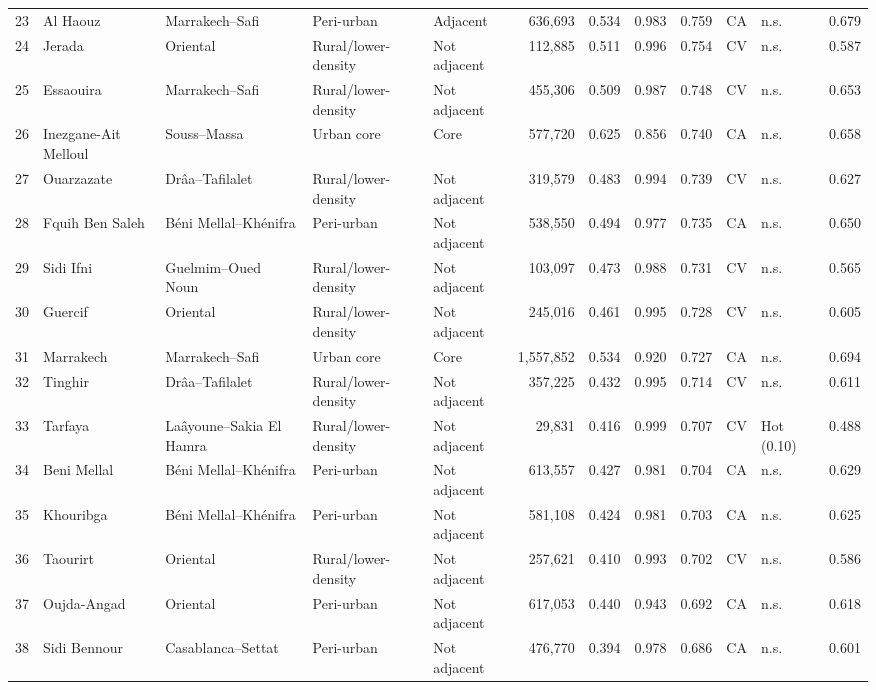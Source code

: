 \documentclass[10pt]{article}
\begin{document}
\begin{longtable}{@{}r>{\raggedright\arraybackslash}p{2.9cm}>{\raggedright\arraybackslash}p{3.3cm}llrrrrllr@{}}
23 & Al Haouz & Marrakech--Safi & Peri-urban & Adjacent & 636,693 & 0.534 & 0.983 & 0.759 & CA & n.s. & 0.679 \\
24 & Jerada & Oriental & Rural/lower-density & Not adjacent & 112,885 & 0.511 & 0.996 & 0.754 & CV & n.s. & 0.587 \\
25 & Essaouira & Marrakech--Safi & Rural/lower-density & Not adjacent & 455,306 & 0.509 & 0.987 & 0.748 & CV & n.s. & 0.653 \\
26 & Inezgane-Ait Melloul & Souss--Massa & Urban core & Core & 577,720 & 0.625 & 0.856 & 0.740 & CA & n.s. & 0.658 \\
27 & Ouarzazate & Drâa--Tafilalet & Rural/lower-density & Not adjacent & 319,579 & 0.483 & 0.994 & 0.739 & CV & n.s. & 0.627 \\
28 & Fquih Ben Saleh & Béni Mellal--Khénifra & Peri-urban & Not adjacent & 538,550 & 0.494 & 0.977 & 0.735 & CA & n.s. & 0.650 \\
29 & Sidi Ifni & Guelmim--Oued Noun & Rural/lower-density & Not adjacent & 103,097 & 0.473 & 0.988 & 0.731 & CV & n.s. & 0.565 \\
30 & Guercif & Oriental & Rural/lower-density & Not adjacent & 245,016 & 0.461 & 0.995 & 0.728 & CV & n.s. & 0.605 \\
31 & Marrakech & Marrakech--Safi & Urban core & Core & 1,557,852 & 0.534 & 0.920 & 0.727 & CA & n.s. & 0.694 \\
32 & Tinghir & Drâa--Tafilalet & Rural/lower-density & Not adjacent & 357,225 & 0.432 & 0.995 & 0.714 & CV & n.s. & 0.611 \\
33 & Tarfaya & Laâyoune--Sakia El Hamra & Rural/lower-density & Not adjacent & 29,831 & 0.416 & 0.999 & 0.707 & CV & Hot (0.10) & 0.488 \\
34 & Beni Mellal & Béni Mellal--Khénifra & Peri-urban & Not adjacent & 613,557 & 0.427 & 0.981 & 0.704 & CA & n.s. & 0.629 \\
35 & Khouribga & Béni Mellal--Khénifra & Peri-urban & Not adjacent & 581,108 & 0.424 & 0.981 & 0.703 & CA & n.s. & 0.625 \\
36 & Taourirt & Oriental & Rural/lower-density & Not adjacent & 257,621 & 0.410 & 0.993 & 0.702 & CV & n.s. & 0.586 \\
37 & Oujda-Angad & Oriental & Peri-urban & Not adjacent & 617,053 & 0.440 & 0.943 & 0.692 & CA & n.s. & 0.618 \\
38 & Sidi Bennour & Casablanca--Settat & Peri-urban & Not adjacent & 476,770 & 0.394 & 0.978 & 0.686 & CA & n.s. & 0.601 \\

\end{longtable}
\end{document}
